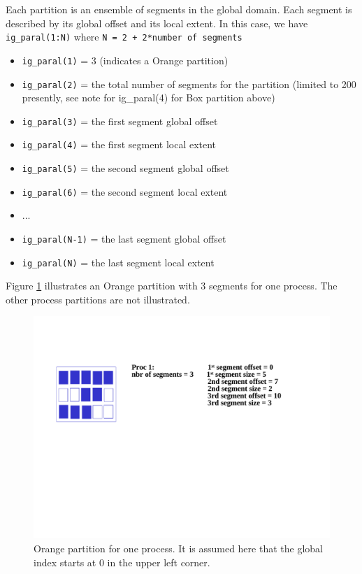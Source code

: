 Each partition is an ensemble of segments in the global domain. Each
segment is described by its global offset and its local extent.  In
this case, we have {\tt ig\_paral(1:N)} where {\tt N = 2 + 2*number of
  segments}

\begin{itemize}
\item {\tt ig\_paral(1)} = 3 (indicates a Orange partition)
\item {\tt ig\_paral(2)} = the total number of segments for the
  partition (limited to 200 presently, see note for ig\_paral(4) for
  Box partition above)
\item {\tt ig\_paral(3)} = the first segment global offset
\item {\tt ig\_paral(4)} = the first segment local extent
\item {\tt ig\_paral(5)} = the second segment global offset
\item {\tt ig\_paral(6)} = the second segment local extent
\item ...
\item {\tt ig\_paral(N-1)} = the last segment global offset
\item {\tt ig\_paral(N)} = the last segment local extent
\end{itemize}

Figure \ref{orange_partition} illustrates an Orange partition with 3
segments for one process. The other process partitions are not
illustrated.

\begin{figure}
  \includegraphics[scale=.6]{figures/orange_new}
  \caption{Orange partition for one process. It is assumed here that
    the global index starts at 0 in the upper left corner.}
  \label{orange_partition}
\end{figure}

